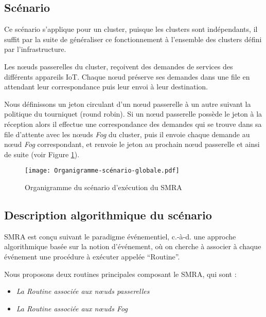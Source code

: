 \subsection{Scénario}
Ce scénario s'applique pour un cluster, puisque les clusters sont indépendants, il suffit par la suite de généraliser ce fonctionnement à l'ensemble des clusters défini par l'infrastructure.\par
Les nœuds passerelles du cluster, reçoivent des demandes de services des différents appareils IoT. Chaque nœud préserve ses demandes dans une file en attendant leur correspondance puis leur envoi à leur destination.\par
Nous définissons un jeton circulant d'un nœud passerelle à un autre suivant la politique du tourniquet (round robin). Si un nœud passerelle possède le jeton à la réception alors il effectue une correspondance des demandes qui se trouve dans sa file d'attente avec les nœuds \emph{Fog} du cluster, puis il envoie chaque demande au nœud \emph{Fog} correspondant, et  renvoie le jeton au prochain nœud passerelle et ainsi de suite (voir Figure \ref{fig:Organigrame_scénario_globale}).



\begin{figure}[H]
  \centering
  \texttt{[image: Organigramme-scénario-globale.pdf]}
  \caption{Organigramme du scénario d'exécution du SMRA}
  \label{fig:Organigrame_scénario_globale}
\end{figure}



\subsection{Description algorithmique du scénario}



SMRA est conçu suivant le paradigme événementiel, c.-à-d. une approche algorithmique basée sur la notion d'événement, où on cherche à associer à chaque événement une procédure à exécuter appelée “Routine”.\par   
Nous proposons deux routines principales composant le SMRA, qui sont :
\begin{itemize}
    \item \emph{La Routine associée aux nœuds passerelles}
    \item \emph{La Routine associée aux nœuds Fog}
\end{itemize}



